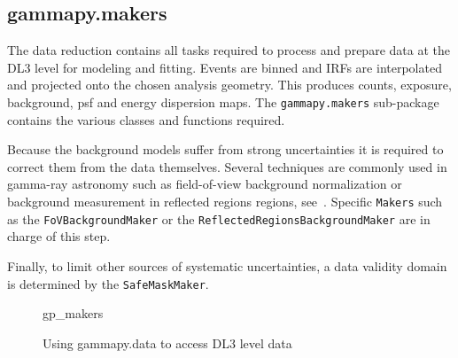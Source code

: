 \subsection{gammapy.makers}
\label{ssec:gammapy-makers}


The data reduction contains all tasks required to process and prepare data at the DL3
level for modeling and fitting. Events are binned and IRFs are interpolated and
projected onto the chosen analysis geometry. This produces counts, exposure, background, psf
and energy dispersion maps.
The {\tt gammapy.makers} sub-package contains the various classes and functions required.

Because the background models suffer from strong uncertainties it is required to correct
them from the data themselves. Several techniques are commonly used in gamma-ray astronomy
such as field-of-view background normalization or background measurement in reflected regions 
regions, see~\cite{test}. Specific {\tt Makers} such as the {\tt FoVBackgroundMaker} or the
{\tt ReflectedRegionsBackgroundMaker} are in charge of this step.

Finally, to limit other sources of systematic uncertainties, a data validity domain is
determined by the {\tt SafeMaskMaker}.



\begin{figure}
	{gp_makers}

	\caption{Using gammapy.data to access DL3 level data}
	\label{ig*:minted:gp_makers}
\end{figure}
